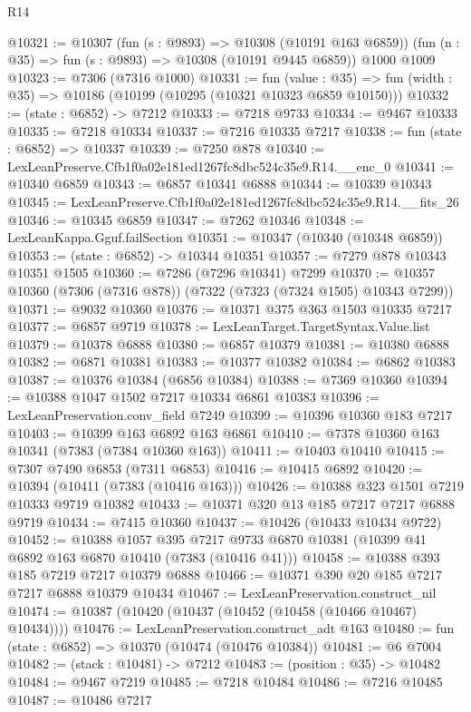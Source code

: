 \begin{lexlean}{R14}
\begin{coremodule}
@10321 := @10307
    (fun (s : @9893) => @10308 (@10191 @163 @6859))
    (fun (n : @35) => fun (s : @9893) => @10308 (@10191 @9445 @6859))
    @1000
    @1009
@10323 := @7306 (@7316 @1000)
@10331 := fun (value : @35) =>
  fun (width : @35) => @10186 (@10199 (@10295 (@10321 @10323 @6859 @10150)))
@10332 := (state : @6852) -> @7212
@10333 := @7218 @9733
@10334 := @9467 @10333
@10335 := @7218 @10334
@10337 := @7216 @10335 @7217
@10338 := fun (state : @6852) => @10337
@10339 := @7250 @878
@10340 := LexLeanPreserve.Cfb1f0a02e181ed1267fc8dbc524c35e9.R14.__enc_0
@10341 := @10340 @6859
@10343 := @6857 @10341 @6888
@10344 := @10339 @10343
@10345 := LexLeanPreserve.Cfb1f0a02e181ed1267fc8dbc524c35e9.R14.__fits_26
@10346 := @10345 @6859
@10347 := @7262 @10346
@10348 := LexLeanKappa.Gguf.failSection
@10351 := @10347 (@10340 (@10348 @6859))
@10353 := (state : @6852) -> @10344 @10351
@10357 := @7279 @878 @10343 @10351 @1505
@10360 := @7286 (@7296 @10341) @7299
@10370 := @10357 @10360 (@7306 (@7316 @878)) (@7322 (@7323 (@7324 @1505) @10343 @7299))
@10371 := @9032 @10360
@10376 := @10371 @375 @363 @1503 @10335 @7217
@10377 := @6857 @9719
@10378 := LexLeanTarget.TargetSyntax.Value.list
@10379 := @10378 @6888
@10380 := @6857 @10379
@10381 := @10380 @6888
@10382 := @6871 @10381
@10383 := @10377 @10382
@10384 := @6862 @10383
@10387 := @10376 @10384 (@6856 @10384)
@10388 := @7369 @10360
@10394 := @10388 @1047 @1502 @7217 @10334 @6861 @10383
@10396 := LexLeanPreservation.conv_field @7249
@10399 := @10396 @10360 @183 @7217
@10403 := @10399 @163 @6892 @163 @6861
@10410 := @7378 @10360 @163 @10341 (@7383 (@7384 @10360 @163))
@10411 := @10403 @10410
@10415 := @7307 @7490 @6853 (@7311 @6853)
@10416 := @10415 @6892
@10420 := @10394 (@10411 (@7383 (@10416 @163)))
@10426 := @10388 @323 @1501 @7219 @10333 @9719 @10382
@10433 := @10371 @320 @13 @185 @7217 @7217 @6888 @9719
@10434 := @7415 @10360
@10437 := @10426 (@10433 @10434 @9722)
@10452 := @10388
    @1057
    @395
    @7217
    @9733
    @6870
    @10381
    (@10399 @41 @6892 @163 @6870 @10410 (@7383 (@10416 @41)))
@10458 := @10388 @393 @185 @7219 @7217 @10379 @6888
@10466 := @10371 @390 @20 @185 @7217 @7217 @6888 @10379 @10434
@10467 := LexLeanPreservation.construct_nil
@10474 := @10387 (@10420 (@10437 (@10452 (@10458 (@10466 @10467) @10434))))
@10476 := LexLeanPreservation.construct_adt @163
@10480 := fun (state : @6852) => @10370 (@10474 (@10476 @10384))
@10481 := @6 @7004
@10482 := (stack : @10481) -> @7212
@10483 := (position : @35) -> @10482
@10484 := @9467 @7219
@10485 := @7218 @10484
@10486 := @7216 @10485
@10487 := @10486 @7217

\end{coremodule}
\end{lexlean}
